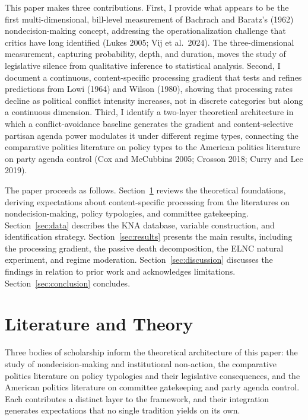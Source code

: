 \documentclass[11pt]{article}
\begin{document}
This paper makes three contributions. First, I provide what appears to be the first multi-dimensional, bill-level measurement of Bachrach and Baratz's (1962) nondecision-making concept, addressing the operationalization challenge that critics have long identified (Lukes 2005; Vij et al.\ 2024). The three-dimensional measurement, capturing probability, depth, and duration, moves the study of legislative silence from qualitative inference to statistical analysis. Second, I document a continuous, content-specific processing gradient that tests and refines predictions from Lowi (1964) and Wilson (1980), showing that processing rates decline as political conflict intensity increases, not in discrete categories but along a continuous dimension. Third, I identify a two-layer theoretical architecture in which a conflict-avoidance baseline generates the gradient and content-selective partisan agenda power modulates it under different regime types, connecting the comparative politics literature on policy types to the American politics literature on party agenda control (Cox and McCubbins 2005; Crosson 2018; Curry and Lee 2019).

The paper proceeds as follows. Section~\ref{sec:lit} reviews the theoretical foundations, deriving expectations about content-specific processing from the literatures on nondecision-making, policy typologies, and committee gatekeeping. Section~\ref{sec:data} describes the KNA database, variable construction, and identification strategy. Section~\ref{sec:results} presents the main results, including the processing gradient, the passive death decomposition, the ELNC natural experiment, and regime moderation. Section~\ref{sec:discussion} discusses the findings in relation to prior work and acknowledges limitations. Section~\ref{sec:conclusion} concludes.


\section{Literature and Theory}
\label{sec:lit}

Three bodies of scholarship inform the theoretical architecture of this paper: the study of nondecision-making and institutional non-action, the comparative politics literature on policy typologies and their legislative consequences, and the American politics literature on committee gatekeeping and party agenda control. Each contributes a distinct layer to the framework, and their integration generates expectations that no single tradition yields on its own.
\end{document}
